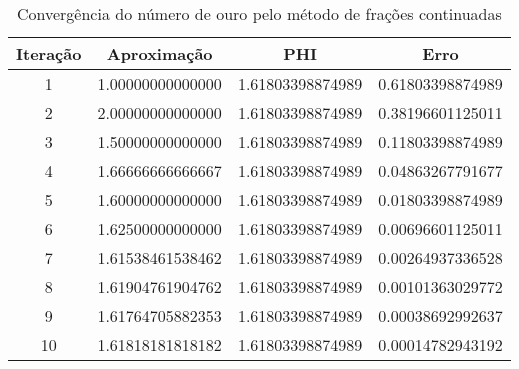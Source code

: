 \begin{table}[H]
\centering 
\begin{tabular}{|c|c|c|c|}
\hline 
Iteração & Aproximação &  PHI & Erro \\ 
\hline 
1 & 1.00000000000000 &  1.61803398874989 & 0.61803398874989 \\ 
\hline
2 & 2.00000000000000 &  1.61803398874989 & 0.38196601125011 \\ 
\hline
3 & 1.50000000000000 &  1.61803398874989 & 0.11803398874989 \\ 
\hline
4 & 1.66666666666667 &  1.61803398874989 & 0.04863267791677 \\ 
\hline
5 & 1.60000000000000 &  1.61803398874989 & 0.01803398874989 \\ 
\hline
6 & 1.62500000000000 &  1.61803398874989 & 0.00696601125011 \\ 
\hline
7 & 1.61538461538462 &  1.61803398874989 & 0.00264937336528 \\ 
\hline
8 & 1.61904761904762 &  1.61803398874989 & 0.00101363029772 \\ 
\hline
9 & 1.61764705882353 &  1.61803398874989 & 0.00038692992637 \\ 
\hline
10 & 1.61818181818182 &  1.61803398874989 & 0.00014782943192 \\ 
\hline
\end{tabular}
\label{table:phi-frac}
\caption{Convergência do número de ouro pelo método de frações continuadas}
\end{table}